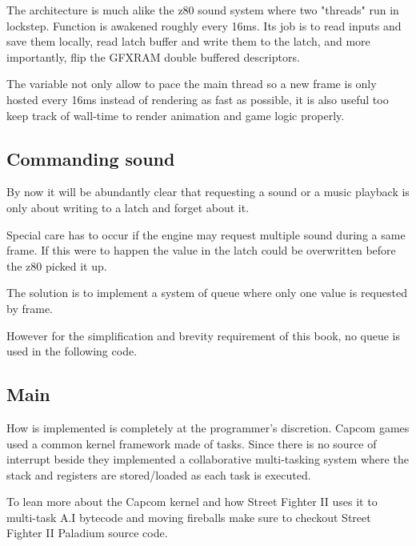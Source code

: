 The architecture is much alike the z80 sound system where two "threads" run in lockstep. Function  is awakened roughly every 16ms. Its job is to read inputs and save them locally, read latch buffer and write them to the latch, and more importantly, flip the GFXRAM double buffered descriptors. 

\begin{trivia}
The  variable not only allow to pace the main thread so a new frame is only hosted every 16ms instead of rendering as fast as possible, it is also useful too keep track of wall-time to render animation and game logic properly.
\end{trivia}


\subsection{Commanding sound}
By now it will be abundantly clear that requesting a sound or a music playback is only about writing to a latch and forget about it. 

Special care has to occur if the engine may request multiple sound during a same frame. If this were to happen the value in the latch could be overwritten before the z80 picked it up.

The solution is to implement a system of queue where only one value is requested by frame.

However for the simplification and brevity requirement of this book, no queue is used in the following code.

 

\subsection{Main}
 

How  is implemented is completely at the programmer's discretion. Capcom games used a common kernel framework made of tasks. Since there is no source of interrupt beside  they implemented a collaborative multi-tasking system where the stack and registers are stored/loaded as each task is executed.

To lean more about the Capcom kernel and how Street Fighter II uses it to multi-task A.I bytecode and moving fireballs make sure to checkout Street Fighter II Paladium source code\cite{sf2platinium}.

